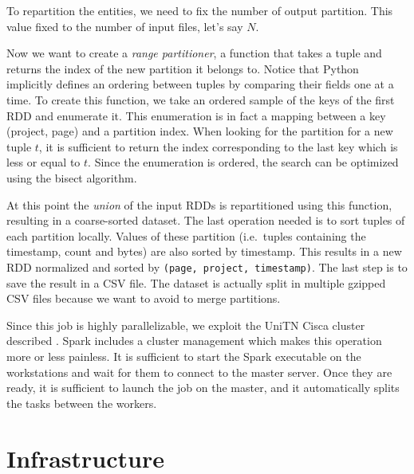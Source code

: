 To repartition the entities, we need to fix the number of output partition.
This value fixed to the number of input files, let's say $N$.

Now we want to create a \emph{range partitioner}, a function that takes a tuple and returns the index of the new partition it belongs to.
Notice that Python implicitly defines an ordering between tuples by comparing their fields one at a time.
To create this function, we take an ordered sample of the keys of the first \ac{RDD} and enumerate it.
This enumeration is in fact a mapping between a key (project, page) and a partition index.
When looking for the partition for a new tuple $t$, it is sufficient to return the index corresponding to the last key which is less or equal to $t$.
Since the enumeration is ordered, the search can be optimized using the bisect algorithm.

At this point the \emph{union} of the input \acp{RDD} is repartitioned using this function, resulting in a coarse-sorted dataset.
The last operation needed is to sort tuples of each partition locally.
Values of these partition (i.e.\ tuples containing the timestamp, count and bytes) are also sorted by timestamp.
This results in a new \ac{RDD} normalized and sorted by \texttt{(page, project, timestamp)}.
The last step is to save the result in a CSV file.
The dataset is actually split in multiple gzipped CSV files because we want to avoid to merge partitions.

Since this job is highly parallelizable, we exploit the UniTN Cisca cluster described .
Spark includes a cluster management which makes this operation more or less painless.
It is sufficient to start the Spark executable on the workstations and wait for them to connect to the master server.
Once they are ready, it is sufficient to launch the job on the master, and it automatically splits the tasks between the workers.




\section{Infrastructure}
\label{sec:infrastructure}

